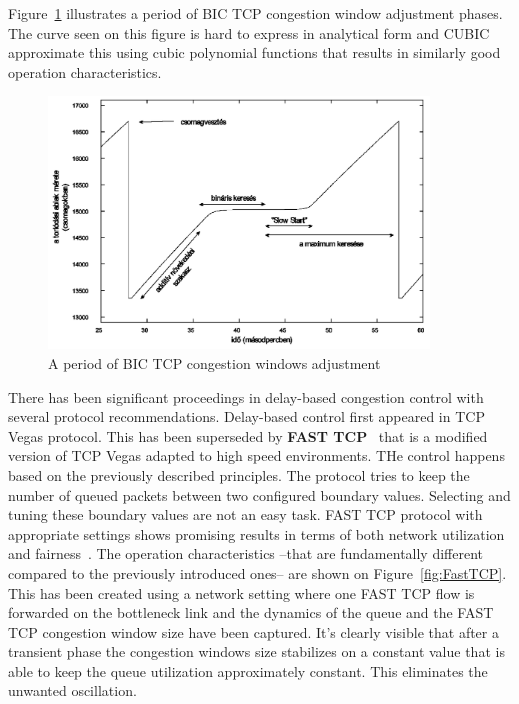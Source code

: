 \documentclass[a4paper]{article}
\begin{document}
Figure~\ref{fig:bictcp} illustrates a period of BIC TCP congestion window adjustment phases. The curve seen on this figure is hard to express in analytical form and CUBIC approximate this using cubic polynomial functions that results in similarly good operation characteristics.

\begin{figure}[H]
    \centering
    \includegraphics[width=0.9\textwidth]{figures/BICTCP.png}
    \caption{A period of BIC TCP congestion windows adjustment}
    \label{fig:bictcp}
\end{figure}

There has been significant proceedings in delay-based congestion control with several protocol recommendations. Delay-based control first appeared in TCP Vegas protocol. This has been superseded by \textbf{FAST TCP}~\cite{FastTCP} that is a modified version of TCP Vegas adapted to high speed environments. THe control happens based on the previously described principles. The protocol tries to keep the number of queued packets between two configured boundary values. Selecting and tuning these boundary values are not an easy task. FAST TCP protocol with appropriate settings shows promising results in terms of both network utilization and fairness~\cite{TCPFairnessAnalysis}. The operation characteristics --that are fundamentally different compared to the previously introduced ones-- are shown on Figure~\ref{fig:FastTCP}. This has been created using a network setting where one FAST TCP flow is forwarded on the bottleneck link and the dynamics of the queue and the FAST TCP congestion window size have been captured. It's clearly visible that after a transient phase the congestion windows size stabilizes on a constant value that is able to keep the queue utilization approximately constant. This eliminates the unwanted oscillation.
\end{document}
